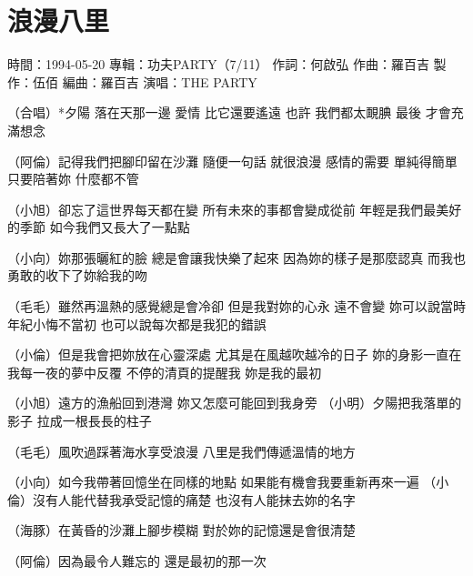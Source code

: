 \documentclass[UTF8,a4paper,oneside,twocolumn,12pt]{ctexbook}
\newcommand{\infopair}[2]{\textbullet #1：#2}
\newcommand{\zc}[1][伍佰]{\infopair{作詞}{#1}}
\newcommand{\zq}[1][伍佰]{\infopair{作曲}{#1}}
\newcommand{\bq}[1][伍佰]{\infopair{編曲}{#1}}
\newcommand{\zj}[1]{\infopair{專輯}{#1}}
\newcommand{\zz}[1]{\infopair{製作}{#1}}
\newcommand{\sj}[1]{\infopair{時間}{#1}}
\newenvironment{info}{\begin{flushleft}\kaishu
	}
	{\end{flushleft}\normalsize\yahei\par}
\newenvironment{lyric}{
	}
{}
\begin{document}
\section{浪漫八里}
\begin{info}
	\sj{1994-05-20}
	\zj{功夫PARTY（7/11）}
	\zc[何啟弘]
	\zq[羅百吉]
	\zz{伍佰}
	\bq[羅百吉]
	\infopair{演唱}{THE PARTY}
\end{info}
\begin{lyric}
	（合唱）*夕陽 落在天那一邊 愛情 比它還要遙遠
	也許 我們都太靦腆 最後 才會充滿想念

	（阿倫）記得我們把腳印留在沙灘 隨便一句話 就很浪漫
	感情的需要 單純得簡單 只要陪著妳 什麼都不管

	（小旭）卻忘了這世界每天都在變 所有未來的事都會變成從前
	年輕是我們最美好的季節 如今我們又長大了一點點

	（小向）妳那張曬紅的臉 總是會讓我快樂了起來
	因為妳的樣子是那麼認真 而我也勇敢的收下了妳給我的吻

	（毛毛）雖然再溫熱的感覺總是會冷卻 但是我對妳的心永 遠不會變
	妳可以說當時年紀小悔不當初 也可以說每次都是我犯的錯誤

	（小倫）但是我會把妳放在心靈深處 尤其是在風越吹越冷的日子
	妳的身影一直在我每一夜的夢中反覆
	不停的清頁的提醒我 妳是我的最初

	（小旭）遠方的漁船回到港灣 妳又怎麼可能回到我身旁
	（小明）夕陽把我落單的影子 拉成一根長長的柱子

	（毛毛）風吹過踩著海水享受浪漫 八里是我們傳遞溫情的地方

	（小向）如今我帶著回憶坐在同樣的地點
	如果能有機會我要重新再來一遍
	（小倫）沒有人能代替我承受記憶的痛楚
	也沒有人能抹去妳的名字

	（海豚）在黃昏的沙灘上腳步模糊 對於妳的記憶還是會很清楚

	（阿倫）因為最令人難忘的 還是最初的那一次
\end{lyric}
\end{document}

